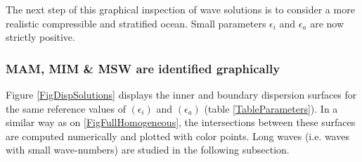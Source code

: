 \documentclass[a4paper,11pt]{article}
\begin{document}
The next step of this graphical inspection of wave solutions is to consider a more realistic compressible and stratified ocean. Small parameters $\epsilon_i$ and $\epsilon_a$ are now strictly positive.

\subsubsection{MAM, MIM \& MSW are identified graphically}
Figure \ref{FigDispSolutions} displays the inner and boundary dispersion surfaces for the same reference values of  $(\epsilon_i)$ and $(\epsilon_a)$ (table \ref{TableParameters}). In a similar way as on \ref{FigFullHomogeneous}, the intersections between these surfaces are computed numerically and plotted with color points. Long waves (i.e. waves with small wave-numbers) are studied in the following subsection.\\
\end{document}
